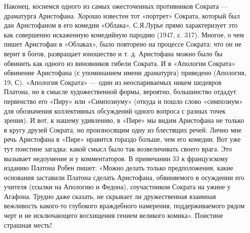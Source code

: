 Наконец,  коснемся одного  из самых  ожесточенных противников  Сократа
---  драматурга Аристофана.  Хорошо  известен  тот «портрет»  Сократа,
который был  дан Аристофаном в  его комедии «Облака».  С.Я.Лурье прямо
характеризует это как совершенно  искаженную комедийную пародию (1947,
с. 317). Многое, о чем пишет  Аристофан в «Облаках», было повторено на
процессе Сократа: что  он не верит в богов, развращает  юношество и т.
д.  Аристофана  можно  было  бы  обвинить  как  одного  из  виновников
гибели  Сократа.  И  в  «Апологии  Сократа»  обвинение  Аристофана  (с
упоминанием имени  драматурга) приведено (Апология, 19,  С). «Апология
Сократа»  --- один  из  неоспариваемых никем  шедевров  Платона, но  в
смысле художественной формы,  вероятно, большинство отдадут первенство
его  «Пиру» или  «Симпозиуму» (откуда  и пошло  слово «симпозиум»  для
обозначения  коллективных обсуждений  одного  вопроса  с разных  точек
зрения). И  вот, к нашему удивлению,  в «Пире» мы видим  Аристофана не
только  в кругу  друзей  Сократа, но  произносящим  одну из  блестящих
речей. Лично мне речь Аристофана в «Пире» нравится гораздо больше, чем
его  комедии. Вот  уже  тут  поистине загадка:  какой  смысл было  так
возвеличивать своего врага. Это вызывает недоумение и у комментаторов.
В примечании  33 к  французскому изданию  Платона Робен  пишет: «Можно
делать только предположения, какие основания заставили Платона сделать
Аристофана, обвиняемого в осуждении его  учителя (ссылки на Апологию и
Федона), соучастником Сократа на ужине у Агафона. Трудно даже сказать,
не скрывает  ли дружественная взаимная вежливость  какого-то глубокого
враждебного намерения,  поддерживаемого рядом  черт и  не исключающего
восхищения гением великого комика». Поистине страшная месть!

